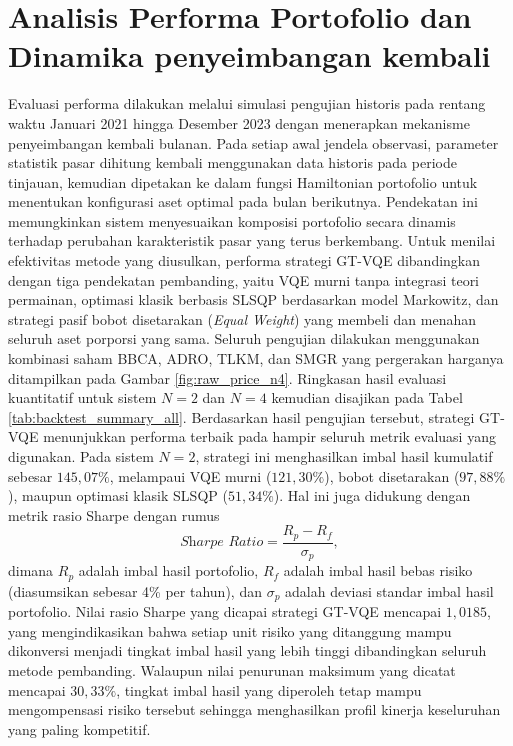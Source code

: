 \section{Analisis Performa Portofolio dan Dinamika penyeimbangan kembali}
\label{sec:4_10_performa_akhir}

Evaluasi performa dilakukan melalui simulasi pengujian historis pada rentang waktu Januari 2021 hingga Desember 2023 dengan menerapkan mekanisme penyeimbangan kembali bulanan. Pada setiap awal jendela observasi, parameter statistik pasar dihitung kembali menggunakan data historis pada periode tinjauan, kemudian dipetakan ke dalam fungsi Hamiltonian portofolio untuk menentukan konfigurasi aset optimal pada bulan berikutnya. Pendekatan ini memungkinkan sistem menyesuaikan komposisi portofolio secara dinamis terhadap perubahan karakteristik pasar yang terus berkembang. Untuk menilai efektivitas metode yang diusulkan, performa strategi GT-VQE dibandingkan dengan tiga pendekatan pembanding, yaitu VQE murni tanpa integrasi teori permainan, optimasi klasik berbasis SLSQP berdasarkan model Markowitz, dan strategi pasif bobot disetarakan (\textit{Equal Weight}) yang membeli dan menahan seluruh aset porporsi yang sama. Seluruh pengujian dilakukan menggunakan kombinasi saham BBCA, ADRO, TLKM, dan SMGR yang pergerakan harganya ditampilkan pada Gambar \ref{fig:raw_price_n4}. Ringkasan hasil evaluasi kuantitatif untuk sistem $N=2$ dan $N=4$ kemudian disajikan pada Tabel \ref{tab:backtest_summary_all}. Berdasarkan hasil pengujian tersebut, strategi GT-VQE menunjukkan performa terbaik pada hampir seluruh metrik evaluasi yang digunakan. Pada sistem $N=2$, strategi ini menghasilkan imbal hasil kumulatif sebesar $145,07\%$, melampaui VQE murni ($121,30\%$), bobot disetarakan ($97,88\%$), maupun optimasi klasik SLSQP ($51,34\%$). Hal ini juga didukung dengan metrik rasio Sharpe dengan rumus 
\begin{equation}
\textit{Sharpe Ratio} = \frac{R_p - R_f}{\sigma_p},
\end{equation} 
dimana $R_p$ adalah imbal hasil portofolio, $R_f$ adalah imbal hasil bebas risiko (diasumsikan sebesar 4\% per tahun), dan $\sigma_p$ adalah deviasi standar imbal hasil portofolio. Nilai rasio Sharpe yang dicapai strategi GT-VQE mencapai $1,0185$, yang mengindikasikan bahwa setiap unit risiko yang ditanggung mampu dikonversi menjadi tingkat imbal hasil yang lebih tinggi dibandingkan seluruh metode pembanding. Walaupun nilai penurunan maksimum yang dicatat mencapai $30,33\%$, tingkat imbal hasil yang diperoleh tetap mampu mengompensasi risiko tersebut sehingga menghasilkan profil kinerja keseluruhan yang paling kompetitif.

